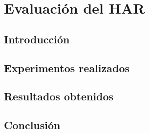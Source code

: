 
\chapter{Evaluación del HAR}

\label{chap6:evaluaci=0000F3n}

\section{Introducción}

\section{Experimentos realizados}

\section{Resultados obtenidos}

\section{Conclusión}
